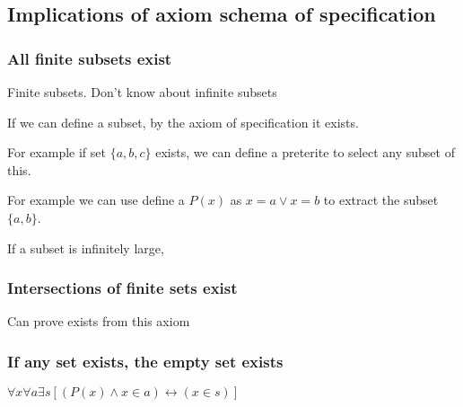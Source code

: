 
\subsection{Implications of axiom schema of specification}

\subsubsection{All finite subsets exist}

Finite subsets. Don't know about infinite subsets

If we can define a subset, by the axiom of specification it exists.

For example if set \(\{a,b,c\}\) exists, we can define a preterite to select any subset of this.

For example we can use define a \(P(x)\) as \(x=a\lor x=b\) to extract the subset \(\{a,b\}\).

If a subset is infinitely large, 

\subsubsection{Intersections of finite sets exist}

Can prove exists from this axiom

\subsubsection{If any set exists, the empty set exists}

\(\forall x \forall a \exists s[(P(x)\land x\in a )\leftrightarrow (x\in s)]\)

